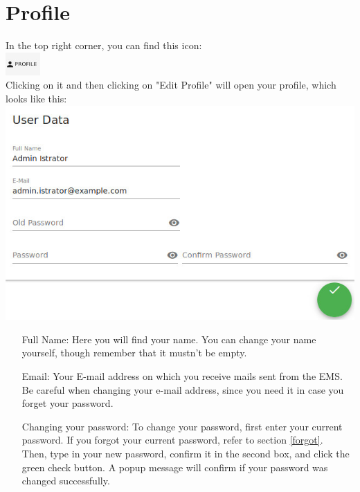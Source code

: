 \documentclass[twoside,a4paper]{refart}
\begin{document}
    \section{Profile}
    \label{profile}
    In the top right corner, you can find this icon: \\
    \includegraphics[width=50px]{profile.jpeg} \\
    Clicking on it and then clicking on "Edit Profile" will open your profile, which looks like this: \\
    \includegraphics[width=\linewidth]{userprofile.jpeg} \\
    \begin{itemize}
    \item[Full Name:] Here you will find your name. You can change your name yourself, though remember that it mustn't be empty.
    \item[Email:] Your E-mail address on which you receive mails sent from the EMS. Be careful when changing your e-mail address, since you need it in case you forget your password.
    \item[Changing your password:]
    To change your password, first enter your current password. If you forgot your current password, refer to section \ref{forgot}. \\
    Then, type in your new password, confirm it in the second box, and click the green check button. A popup message will confirm if your password was changed successfully.
\end{itemize}     
    
\end{document}

